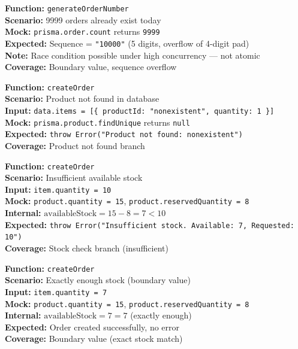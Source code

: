 \documentclass[12pt,a4paper]{report}
\newcommand{\pone}{\textbf{\color{p1red}P1}}
\newcommand{\pthree}{\textbf{\color{p3blue}P3}}
\begin{document}
\begin{tcolorbox}[testbox, title={ORD-002 \hfill \pthree\ --- Boundary}]
\textbf{Function:} \texttt{generateOrderNumber} \\
\textbf{Scenario:} 9999 orders already exist today \\
\textbf{Mock:} \texttt{prisma.order.count} returns \texttt{9999} \\
\textbf{Expected:} Sequence = \texttt{"10000"} (5 digits, overflow of 4-digit pad) \\
\textbf{Note:} Race condition possible under high concurrency --- not atomic \\
\textbf{Coverage:} Boundary value, sequence overflow
\end{tcolorbox}

\begin{tcolorbox}[criticalbox, title={ORD-003 \hfill \pone\ --- Product Not Found}]
\textbf{Function:} \texttt{createOrder} \\
\textbf{Scenario:} Product not found in database \\
\textbf{Input:} \texttt{data.items = [\{ productId: "nonexistent", quantity: 1 \}]} \\
\textbf{Mock:} \texttt{prisma.product.findUnique} returns \texttt{null} \\
\textbf{Expected:} \texttt{throw Error("Product not found: nonexistent")} \\
\textbf{Coverage:} Product not found branch
\end{tcolorbox}

\begin{tcolorbox}[criticalbox, title={ORD-004 \hfill \pone\ --- Insufficient Stock}]
\textbf{Function:} \texttt{createOrder} \\
\textbf{Scenario:} Insufficient available stock \\
\textbf{Input:} \texttt{item.quantity = 10} \\
\textbf{Mock:} \texttt{product.quantity = 15}, \texttt{product.reservedQuantity = 8} \\
\textbf{Internal:} $\text{availableStock} = 15 - 8 = 7 < 10$ \\
\textbf{Expected:} \texttt{throw Error("Insufficient stock. Available: 7, Requested: 10")} \\
\textbf{Coverage:} Stock check branch (insufficient)
\end{tcolorbox}

\begin{tcolorbox}[testbox, title={ORD-005 \hfill \pone\ --- Exact Stock Boundary}]
\textbf{Function:} \texttt{createOrder} \\
\textbf{Scenario:} Exactly enough stock (boundary value) \\
\textbf{Input:} \texttt{item.quantity = 7} \\
\textbf{Mock:} \texttt{product.quantity = 15}, \texttt{product.reservedQuantity = 8} \\
\textbf{Internal:} $\text{availableStock} = 7 = 7$ (exactly enough) \\
\textbf{Expected:} Order created successfully, no error \\
\textbf{Coverage:} Boundary value (exact stock match)
\end{tcolorbox}
\end{document}
